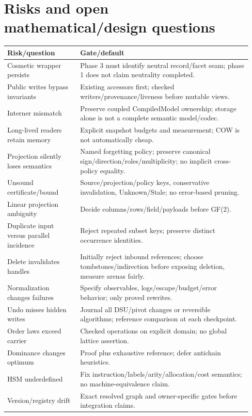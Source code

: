 \documentclass[10pt,a4paper]{article}
\begin{document}
\section{Risks and open mathematical/design questions}
\label{sec:risks}
\begin{longtable}{L{45mm}L{121mm}}
\toprule Risk/question & Gate/default\\\midrule
Cosmetic wrapper persists & Phase 3 must identify neutral record/facet seam; phase 1 does not claim neutrality completed.\\
Public writes bypass invariants & Existing accessors first; checked writers/provenance/liveness before mutable views.\\
Interner mismatch & Preserve coupled CompiledModel ownership; storage alone is not a complete semantic model/codec.\\
Long-lived readers retain memory & Explicit snapshot budgets and measurement; COW is not automatically cheap.\\
Projection silently loses semantics & Named forgetting policy; preserve canonical sign/direction/roles/multiplicity; no implicit cross-policy equality.\\
Unsound certificate/bound & Source/projection/policy keys, conservative invalidation, Unknown/Stale; no error-based pruning.\\
Linear projection ambiguity & Decide columns/rows/field/payloads before GF(2).\\
Duplicate input versus parallel incidence & Reject repeated subset keys; preserve distinct occurrence identities.\\
Delete invalidates handles & Initially reject inbound references; choose tombstones/indirection before exposing deletion, measure arenas fairly.\\
Normalization changes failures & Specify observables, logs/escape/budget/error behavior; only proved rewrites.\\
Undo misses hidden writes & Journal all DSU/pivot changes or reversible algorithms; reference comparison at each checkpoint.\\
Order laws exceed carrier & Checked operations on explicit domain; no global lattice assertion.\\
Dominance changes optimum & Proof plus exhaustive reference; defer antichain heuristics.\\
HSM underdefined & Fix instruction/labels/arity/allocation/cost semantics; no machine-equivalence claim.\\
Version/registry drift & Exact resolved graph and owner-specific gates before integration claims.\\
\bottomrule
\end{longtable}
\end{document}

